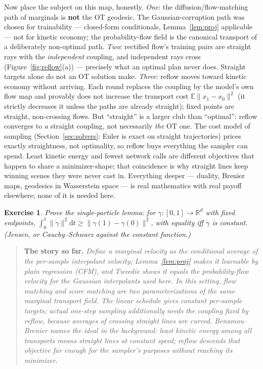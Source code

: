 \documentclass[10pt,a4paper]{article}
\newtheorem{exercise}{Exercise}
\newenvironment{recap}
{\par\medskip\noindent\begin{quote}\small\textbf{The story so far.}\itshape\;}
{\end{quote}\medskip}
\newcommand{\E}{\mathbb{E}}
\newcommand{\R}{\mathbb{R}}
\newcommand{\dd}{\mathrm{d}}
\begin{document}
Now place the subject on this map, honestly. \emph{One}: the
diffusion/flow-matching path of marginals is \textbf{not} the OT
geodesic. The Gaussian-corruption path was chosen for trainability ---
closed-form conditionals, Lemma~\ref{lem:proj} applicable --- not for
kinetic economy; the probability-flow field is the canonical transport
of a deliberately non-optimal path. \emph{Two}: rectified flow's
training pairs are straight rays with the \emph{independent} coupling,
and independent rays cross (Figure~\ref{fig:reflow}(a)) --- precisely
what an optimal plan never does. Straight targets alone do not an OT
solution make. \emph{Three}: reflow moves toward kinetic economy
without arriving. Each round replaces the coupling by the model's own
flow map and provably does not increase the transport cost
$\E\|x_1 - x_0\|^2$ (it strictly decreases it unless the paths are
already straight); fixed points are straight, non-crossing flows. But
``straight'' is a larger club than ``optimal'': reflow converges to
\emph{a} straight coupling, not necessarily \emph{the} OT one. The cost
model of sampling (Section~\ref{sec:solvers}: Euler is exact on
straight trajectories) prices exactly straightness, not optimality, so
reflow buys everything the sampler can spend. Least kinetic energy and
fewest network calls are different objectives that happen to share a
minimizer-shape; that coincidence is why straight lines keep winning
scenes they were never cast in. Everything deeper --- duality, Brenier
maps, geodesics in Wasserstein space --- is real mathematics with real
payoff elsewhere; none of it is needed here.

\begin{exercise}
\label{ex:kinetic}
Prove the single-particle lemma: for $\gamma : [0,1] \to \R^d$ with
fixed endpoints, $\int_0^1 \|\dot\gamma\|^2 \dd t \ge
\|\gamma(1) - \gamma(0)\|^2$, with equality iff $\dot\gamma$ is
constant. (Jensen, or Cauchy--Schwarz against the constant function.)
\end{exercise}

\begin{recap}
Define a marginal velocity as the conditional average of the per-sample
interpolant velocity; Lemma~\ref{lem:proj} makes it learnable by plain
regression (CFM), and Tweedie shows it equals the probability-flow
velocity for the Gaussian interpolants used here. In this setting, flow
matching and score matching are two parameterizations of the same
marginal transport field. The linear schedule gives constant per-sample targets;
actual one-step sampling additionally needs the \emph{coupling} fixed by
reflow, because averages of crossing straight lines are curved.
Benamou--Brenier names the ideal in the background: least kinetic energy
among all transports means straight lines at constant speed; reflow
descends that objective far enough for the sampler's purposes without
reaching its minimizer.
\end{recap}
\end{document}

